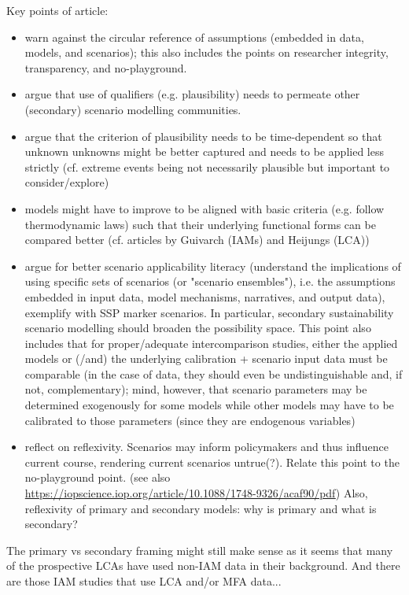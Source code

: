 \documentclass{article}
\begin{document}
Key points of article:
\begin{itemize}
    \item warn against the circular reference of assumptions (embedded in data, models, and scenarios); this also includes the points on researcher integrity, transparency, and no-playground.
    \item argue that use of qualifiers (e.g. plausibility) needs to permeate other (secondary) scenario modelling communities.
    \item argue that the criterion of plausibility needs to be time-dependent so that unknown unknowns might be better captured and needs to be applied less strictly (cf. extreme events being not necessarily plausible but important to consider/explore)
    \item models might have to improve to be aligned with basic criteria (e.g. follow thermodynamic laws) such that their underlying functional forms can be compared better (cf. articles by Guivarch (IAMs) and Heijungs (LCA))
    \item argue for better scenario applicability literacy (understand the implications of using specific sets of scenarios (or "scenario ensembles"), i.e. the assumptions embedded in input data, model mechanisms, narratives, and output data), exemplify with SSP marker scenarios. In particular, secondary sustainability scenario modelling should broaden the possibility space. This point also includes that for proper/adequate intercomparison studies, either the applied models or (/and) the underlying calibration + scenario input data must be comparable (in the case of data, they should even be undistinguishable and, if not, complementary); mind, however, that scenario parameters may be determined exogenously for some models while other models may have to be calibrated to those parameters (since they are endogenous variables)
    \item reflect on reflexivity. Scenarios may inform policymakers and thus influence current course, rendering current scenarios untrue(?). Relate this point to the no-playground point. (see also \url{https://iopscience.iop.org/article/10.1088/1748-9326/acaf90/pdf}) Also, reflexivity of primary and secondary models: why is primary and what is secondary?
\end{itemize}

The primary vs secondary framing might still make sense as it seems that many of the prospective LCAs have used non-IAM data in their background. And there are those IAM studies that use LCA and/or MFA data...
\end{document}
